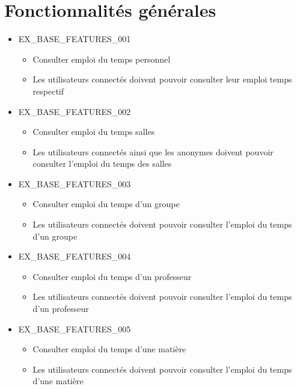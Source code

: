 \documentclass[french]{scrartcl}
\begin{document}
\section{Fonctionnalités générales}
    \begin{itemize}
        \item EX\_BASE\_FEATURES\_001
        \begin{itemize}
            \item Consulter emploi du temps personnel
            \item Les utilisateurs connectés doivent pouvoir consulter leur emploi temps respectif
        \end{itemize}

        \item EX\_BASE\_FEATURES\_002
        \begin{itemize}
            \item Consulter emploi du temps salles
            \item Les utilisateurs connectés ainsi que les anonymes doivent pouvoir consulter l'emploi du temps des salles
        \end{itemize}

        \item EX\_BASE\_FEATURES\_003
        \begin{itemize}
            \item Consulter emploi du temps d'un groupe
            \item Les utilisateurs connectés doivent pouvoir consulter l'emploi du temps d'un groupe
        \end{itemize}

        \item EX\_BASE\_FEATURES\_004
        \begin{itemize}
            \item Consulter emploi du temps d'un professeur
            \item Les utilisateurs connectés doivent pouvoir consulter l'emploi du temps d'un professeur
        \end{itemize}

        \item EX\_BASE\_FEATURES\_005
        \begin{itemize}
            \item Consulter emploi du temps d'une matière
            \item Les utilisateurs connectés doivent pouvoir consulter l'emploi du temps d'une matière
        \end{itemize}


\end{itemize}
\end{document}
